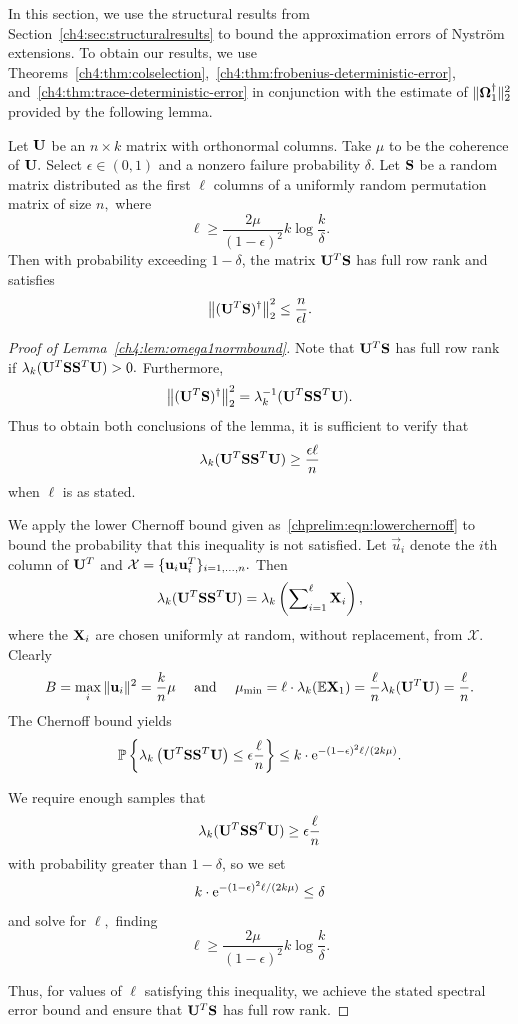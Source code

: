 In this section, we use the structural results from 
Section~\ref{ch4:sec:structuralresults} to bound the approximation errors of 
Nystr\"om extensions. To obtain our results, we use 
Theorems~\ref{ch4:thm:colselection},~\ref{ch4:thm:frobenius-deterministic-error},
 and~\ref{ch4:thm:trace-deterministic-error}
in conjunction with the estimate of
$\|\mathbf{\Omega}_1^\dagger\|_2^2$ provided by the following lemma. 

\begin{lemma}
Let $\mathbf{U}$ be an $n \times k$ matrix with orthonormal columns. Take $\mu$ to
be the coherence of $\mathbf{U}.$
Select $\epsilon \in (0,1)$ and a nonzero failure probability $\delta.$ Let
$\mathbf{S}$ be a random matrix distributed as the first $\ell$ columns of a
uniformly random permutation matrix of size $n,$ where
\[
 \ell \geq \frac{2\mu}{(1-\epsilon)^2}k\log\frac{k}{\delta}.
\]
Then with probability exceeding $1- \delta$, the matrix $\mathbf{U}^T\mathbf{S}$
has full row rank and satisfies
\[
 \left\|(\mathbf{U}^T \mathbf{S})^\dagger\right\|_2^2 \leq \frac{n}{\epsilon l}.
\]
 \label{ch4:lem:omega1normbound}
\end{lemma}

\begin{proof}[Proof of Lemma~\ref{ch4:lem:omega1normbound}]
 Note that $\mathbf{U}^T \mathbf{S}$ has full row rank if
$\lambda_k(\mathbf{U}^T \mathbf{S}\mathbf{S}^T \mathbf{U}) > 0.$ Furthermore,
\[
 \left\|(\mathbf{U}^T \mathbf{S})^\dagger\right\|_2^2 = \lambda_k^{-1}(\mathbf{U}^T
\mathbf{S} \mathbf{S}^T \mathbf{U}).
\]
Thus to obtain both conclusions of the lemma, it is sufficient to verify that 
\[
\lambda_k(\mathbf{U}^T \mathbf{S}\mathbf{S}^T \mathbf{U}) \geq \frac{\epsilon
\ell}{n}
\]
when $\ell$ is as stated.

We apply the lower Chernoff bound given as~\eqref{chprelim:eqn:lowerchernoff} to bound the probability
that this inequality is not satisfied. Let $\vec{u}_i$ denote the $i$th column
of $\mathbf{U}^T$ and $\mathcal{X} = \{ \mathbf{u}_i \mathbf{u}_i^T \}_{i=1,\ldots,n}.$ Then \[
 \lambda_k(\mathbf{U}^T \mathbf{S}\mathbf{S}^T \mathbf{U}) = \lambda_k\left(
\sum\nolimits_{i=1}^\ell \mathbf{X}_i \right),
\]
where the $\mathbf{X}_i$ are chosen uniformly at random, without replacement, from
$\mathcal{X}.$ Clearly
\[
 B = \max_i \|\mathbf{u}_i\|^2 = \frac{k}{n}\mu \quad \text{ and } \quad 
\mu_{\text{min}} = \ell \cdot\lambda_k(\mathbb{E} \mathbf{X}_1) = \frac{\ell}{n}
\lambda_k(\mathbf{U}^T\mathbf{U}) = \frac{\ell}{n}.
\]
The Chernoff bound yields
\[
 \mathbb{P}\left\{\lambda_k\left(\mathbf{U}^T \mathbf{S}\mathbf{S}^T \mathbf{U} \right) \leq
\epsilon \frac{\ell}{n}\right\} \leq k \cdot \mathrm{e}^{-(1-\epsilon)^2 \ell/(2 k \mu)}.
\]

We require enough samples that 
\[
\lambda_k(\mathbf{U}^T \mathbf{S}\mathbf{S}^T \mathbf{U}) \geq \epsilon
\frac{\ell}{n}
\]
with probability greater than $1 - \delta$, so we set 
\[
 k \cdot \mathrm{e}^{-(1-\epsilon)^2 \ell/(2 k \mu)} \leq \delta 
\]
and solve for $\ell,$ finding
\[
 \ell \geq \frac{2\mu}{(1-\epsilon)^2} k\log \frac{k}{\delta}.
\]

Thus, for values of $\ell$ satisfying this inequality, we achieve the stated
spectral error bound and ensure that $\mathbf{U}^T \mathbf{S}$ has full row rank.
\end{proof}

